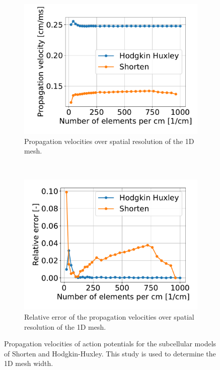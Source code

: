 \begin{figure}%
  \centering%
  \begin{subfigure}[t]{0.45\textwidth}%
    \centering%
    \includegraphics[width=\textwidth]{images/results/studies/propagation_velocity.pdf}%
    \caption{Propagation velocities over spatial resolution of the 1D mesh.}%
    \label{fig:propagation_velocity_comparison}%
  \end{subfigure}
  \,
  \begin{subfigure}[t]{0.45\textwidth}%
    \centering%
    \includegraphics[width=\textwidth]{images/results/studies/propagation_velocity_rel_error.pdf}%
    \caption{Relative error of the propagation velocities over spatial resolution of the 1D mesh.}%
    \label{fig:propagation_velocity_rel_error}%
  \end{subfigure}   
  \caption{Propagation velocities of action potentials for the subcellular models of Shorten and Hodgkin-Huxley. This study is used to determine the 1D mesh width.}%
  \label{fig:propagation_velocity}%
\end{figure}%

